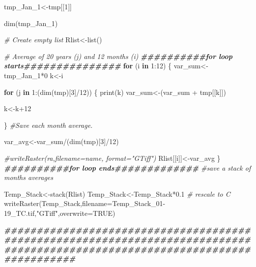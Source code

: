 \documentclass[
  10pt,
  b5paper,
]{book}
\newenvironment{Shaded}{\begin{snugshade}}{\end{snugshade}}
\newcommand{\AttributeTok}[1]{\textcolor[rgb]{0.77,0.63,0.00}{#1}}
\newcommand{\CommentTok}[1]{\textcolor[rgb]{0.56,0.35,0.01}{\textit{#1}}}
\newcommand{\ConstantTok}[1]{\textcolor[rgb]{0.00,0.00,0.00}{#1}}
\newcommand{\ControlFlowTok}[1]{\textcolor[rgb]{0.13,0.29,0.53}{\textbf{#1}}}
\newcommand{\DecValTok}[1]{\textcolor[rgb]{0.00,0.00,0.81}{#1}}
\newcommand{\DocumentationTok}[1]{\textcolor[rgb]{0.56,0.35,0.01}{\textbf{\textit{#1}}}}
\newcommand{\FloatTok}[1]{\textcolor[rgb]{0.00,0.00,0.81}{#1}}
\newcommand{\FunctionTok}[1]{\textcolor[rgb]{0.00,0.00,0.00}{#1}}
\newcommand{\NormalTok}[1]{#1}
\newcommand{\OtherTok}[1]{\textcolor[rgb]{0.56,0.35,0.01}{#1}}
\newcommand{\SpecialCharTok}[1]{\textcolor[rgb]{0.00,0.00,0.00}{#1}}
\newcommand{\StringTok}[1]{\textcolor[rgb]{0.31,0.60,0.02}{#1}}
\begin{document}
\begin{Shaded}
\begin{Highlighting}[]
\NormalTok{tmp\_Jan\_1}\OtherTok{\textless{}{-}}\NormalTok{tmp[[}\DecValTok{1}\NormalTok{]]}

\FunctionTok{dim}\NormalTok{(tmp\_Jan\_1)}

\CommentTok{\# Create empty list}
\NormalTok{Rlist}\OtherTok{\textless{}{-}}\FunctionTok{list}\NormalTok{()}

\CommentTok{\# Average of 20 years (j)  and 12 months (i) }
\DocumentationTok{\#\#\#\#\#\#\#\#\#\#for loop starts\#\#\#\#\#\#\#\#\#\#\#\#\#\#\#}
\ControlFlowTok{for}\NormalTok{ (i }\ControlFlowTok{in} \DecValTok{1}\SpecialCharTok{:}\DecValTok{12}\NormalTok{) \{ }
\NormalTok{var\_sum}\OtherTok{\textless{}{-}}\NormalTok{tmp\_Jan\_1}\SpecialCharTok{*}\DecValTok{0}
\NormalTok{k}\OtherTok{\textless{}{-}}\NormalTok{i}

\ControlFlowTok{for}\NormalTok{ (j }\ControlFlowTok{in} \DecValTok{1}\SpecialCharTok{:}\NormalTok{(}\FunctionTok{dim}\NormalTok{(tmp)[}\DecValTok{3}\NormalTok{]}\SpecialCharTok{/}\DecValTok{12}\NormalTok{)) \{}
\FunctionTok{print}\NormalTok{(k)}
\NormalTok{var\_sum}\OtherTok{\textless{}{-}}\NormalTok{(var\_sum }\SpecialCharTok{+}\NormalTok{ tmp[[k]])}

\NormalTok{k}\OtherTok{\textless{}{-}}\NormalTok{k}\SpecialCharTok{+}\DecValTok{12}

\NormalTok{\}}
\CommentTok{\#Save each month average. }

\NormalTok{var\_avg}\OtherTok{\textless{}{-}}\NormalTok{var\_sum}\SpecialCharTok{/}\NormalTok{(}\FunctionTok{dim}\NormalTok{(tmp)[}\DecValTok{3}\NormalTok{]}\SpecialCharTok{/}\DecValTok{12}\NormalTok{)}

\CommentTok{\#writeRaster(ra,filename=name, format="GTiff")}
\NormalTok{Rlist[[i]]}\OtherTok{\textless{}{-}}\NormalTok{var\_avg}
\NormalTok{\}}
\DocumentationTok{\#\#\#\#\#\#\#\#\#\#for loop ends\#\#\#\#\#\#\#\#\#\#\#\#\#}
\CommentTok{\#save a stack of months averages}

\NormalTok{Temp\_Stack}\OtherTok{\textless{}{-}}\FunctionTok{stack}\NormalTok{(Rlist)}
\NormalTok{Temp\_Stack}\OtherTok{\textless{}{-}}\NormalTok{Temp\_Stack}\SpecialCharTok{*}\FloatTok{0.1} \CommentTok{\# rescale to C}
\FunctionTok{writeRaster}\NormalTok{(Temp\_Stack,}\AttributeTok{filename=}\StringTok{\textquotesingle{}Temp\_Stack\_01{-}19\_TC.tif\textquotesingle{}}\NormalTok{,}\StringTok{"GTiff"}\NormalTok{,}\AttributeTok{overwrite=}\ConstantTok{TRUE}\NormalTok{)}



\DocumentationTok{\#\#\#\#\#\#\#\#\#\#\#\#\#\#\#\#\#\#\#\#\#\#\#\#\#\#\#\#\#\#\#\#\#\#\#\#\#\#\#\#\#\#\#\#\#\#\#\#\#\#\#\#\#\#\#\#\#\#\#\#\#\#\#\#\#\#\#\#\#\#\#\#\#\#\#\#\#\#\#\#\#\#\#\#\#\#\#\#\#\#\#\#\#\#\#\#\#\#\#\#\#\#\#\#\#\#\#\#\#\#\#\#\#\#\#\#\#\#\#\#\#\#\#\#\#}


\end{Highlighting}
\end{Shaded}
\end{document}
